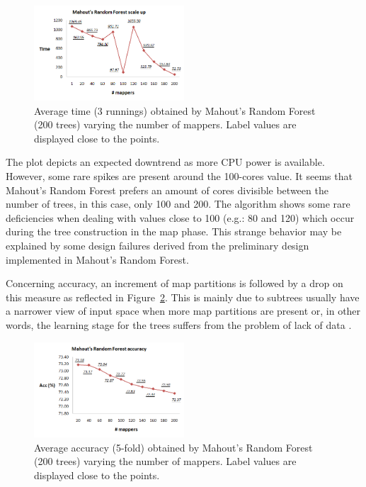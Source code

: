 \documentclass[3p,review]{elsarticle}
\begin{document}
\begin{figure}[!htp]
    \centering
    \includegraphics[width=0.5\textwidth]{rf-mahout}
    \caption{Average time (3 runnings) obtained by Mahout's Random Forest (200 trees) varying the number of mappers. Label values are displayed close to the points.}
    \label{fig:rf-mahout}
\end{figure}

The plot depicts an expected downtrend as more CPU power is available. However, some rare spikes are present around the 100-cores value. It seems that Mahout's Random Forest prefers an amount of cores divisible between the number of trees, in this case, only 100 and 200. The algorithm shows some rare deficiencies when dealing with values close to 100 (e.g.: 80 and 120) which occur during the tree construction in the map phase. This strange behavior may be explained by some design failures derived from the preliminary design implemented in Mahout's Random Forest.

Concerning accuracy, an increment of map partitions is followed by a drop on this measure as reflected in Figure~\ref{fig:rf-mahout-pred}. This is mainly due to subtrees usually have a narrower view of input space when more map partitions are present or, in other words, the learning stage for the trees suffers from the problem of lack of data \cite{Fer17}.

\begin{figure}[!htp]
    \centering
    \includegraphics[width=0.5\textwidth]{rf-mahout-acc}
    \caption{Average accuracy (5-fold) obtained by Mahout's Random Forest (200 trees) varying the number of mappers. Label values are displayed close to the points.}
    \label{fig:rf-mahout-pred}
\end{figure}
\end{document}
